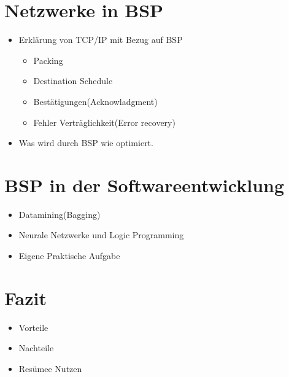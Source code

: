 \documentclass[a4paper,10pt]{scrartcl}
\begin{document}
\section{Netzwerke in BSP}
\begin{itemize}
\item Erklärung von TCP/IP mit Bezug auf BSP
\begin{itemize}
\item Packing
\item Destination Schedule
\item Bestätigungen(Acknowladgment)
\item Fehler Verträglichkeit(Error recovery)
\end{itemize}
\item Was wird durch BSP wie optimiert.

\end{itemize}
\section{BSP in der Softwareentwicklung}
\begin{itemize}
\item Datamining(Bagging)
\item Neurale Netzwerke und Logic Programming
\item Eigene Praktische Aufgabe
\end{itemize}
\section{Fazit}
\begin{itemize}
 \item Vorteile
 \item Nachteile
 \item Resümee Nutzen
\end{itemize}
\newpage
\end{document}
